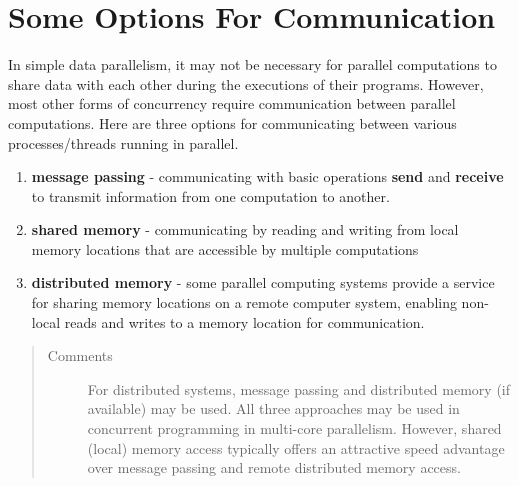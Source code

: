 \documentclass[letterpaper,10pt,openany,oneside]{sphinxmanual}
\begin{document}
\chapter{Some Options For Communication}
\label{OptionsForCommunication/OptionsForCommunication::doc}\label{OptionsForCommunication/OptionsForCommunication:some-options-for-communication}
In simple data parallelism, it may not be necessary for parallel computations to share data with each other during the executions of their programs. However, most other forms of concurrency require communication between parallel computations.  Here are three options for communicating between various processes/threads running in parallel.
\begin{enumerate}
\item {} 
\textbf{message passing} - communicating with basic operations \textbf{send} and \textbf{receive} to transmit information from one computation to another.

\item {} 
\textbf{shared memory} - communicating by reading and writing from local memory locations that are accessible by multiple computations

\item {} 
\textbf{distributed memory} - some parallel computing systems provide a service for sharing memory locations on a remote computer system, enabling non-local reads and writes to a memory location for communication.

\end{enumerate}
\begin{quote}\begin{description}
\item[{Comments}] \leavevmode
For distributed systems, message passing and distributed memory (if available) may be used. All three approaches may be used in concurrent programming in multi-core parallelism. However, shared (local) memory access typically offers an attractive speed advantage over message passing and remote distributed memory access.

\end{description}\end{quote}
\end{document}
